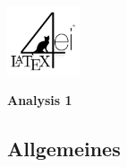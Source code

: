 \documentclass[6pt,a4paper]{scrartcl}
\begin{document}

\begin{multicols*}{4}
\parbox{2.3cm}{
	\includegraphics[height=2cm]{./img/Logo.pdf}
}
\parbox{4cm}{
	\huge{\textbf{Analysis 1}}
}
\subsection{Allgemeines} %
\label{sub:allgemeines}


\end{multicols*}
\end{document}
